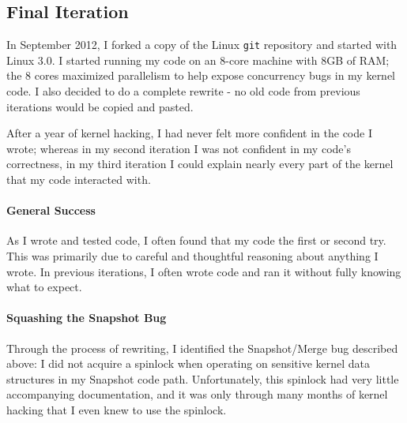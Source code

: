 \subsection{Final Iteration}
In September 2012, I forked a copy of the Linux {\tt git} repository and
started with Linux 3.0. I started running my code on an 8-core machine with
8GB of RAM; the 8 cores maximized parallelism to help expose concurrency
bugs in my kernel code. I also decided to do a complete rewrite - no old code
from previous iterations would be copied and pasted.

After a year of kernel hacking, I had never felt more confident in the code I
wrote; whereas in my second iteration I was not confident in my code's
correctness, in my third iteration I could explain nearly every part of the
kernel that my code interacted with.

\paragraph{General Success}
As I wrote and tested code, I often found that my code the first or second
try. This was primarily due to careful and thoughtful reasoning about anything
I wrote. In previous iterations, I often wrote code and ran it without fully
knowing what to expect.

\paragraph{Squashing the Snapshot Bug}
Through the process of rewriting, I identified the Snapshot/Merge bug described
above: I did not acquire a spinlock when operating on sensitive kernel data
structures in my Snapshot code path. Unfortunately, this spinlock had very
little accompanying documentation, and it was only through many months of
kernel hacking that I even knew to use the spinlock.

\endinput

